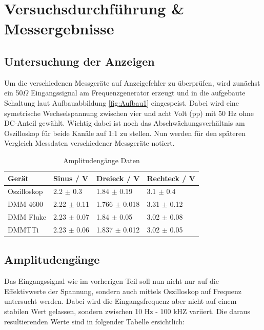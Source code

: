 \documentclass[12pt,a4paper,twoside]{article}
\begin{document}
\section{Versuchsdurchführung \& Messergebnisse} %


\subsection{Untersuchung der Anzeigen}

Um die verschiedenen Messgeräte auf Anzeigefehler zu überprüfen, wird zunächst ein 50$\Omega$ Eingangssignal am Frequenzgenerator erzeugt und in die aufgebaute Schaltung laut Aufbauabbildung \ref{fig:Aufbau1} eingespeist.
Dabei wird eine symetrische Wechselspannung zwischen vier und acht Volt (pp) mit 50 Hz ohne DC-Anteil gewählt. Wichtig dabei ist noch das Abschwächungsverhältnis am Oszilloskop für beide Kanäle auf 1:1 zu stellen. Nun werden für den späteren Vergleich Messdaten verschiedener Messgeräte notiert.

\begin{table}[H]
    \centering
    \caption{Amplitudengänge Daten}
    \label{tab:Daten1}
    \begin{tabular}{| l | l | l | l |}
        \hline
        Gerät   & Sinus / V  & Dreieck / V & Rechteck / V \\
        \hline
        Oszilloskop & 2.2 $\pm$ 0.3  & 1.84 $\pm$ 0.19  & 3.1 $\pm$ 0.4 \\
        DMM 4600    & 2.22 $\pm$ 0.11 & 1.766 $\pm$ 0.018 & 3.31 $\pm$ 0.12 \\
        DMM Fluke   & 2.23 $\pm$ 0.07 & 1.84 $\pm$ 0.05 & 3.02 $\pm$ 0.08 \\
        DMMTTi      & 2.23 $\pm$ 0.06 & 1.837 $\pm$ 0.012 & 3.02 $\pm$ 0.05 \\
        \hline
    \end{tabular}
\end{table}


\subsection{Amplitudengänge}

Das Eingangssignal wie im vorherigen Teil soll nun nicht nur auf die Effektivwerte der Spannung, sondern auch mittels Oszilloskop auf Frequenz untersucht werden.
Dabei wird die Eingangsfrequenz aber nicht auf einem stabilen Wert gelassen, sondern zwischen 10 Hz - 100 kHZ variiert. 
Die daraus resultierenden Werte sind in folgender Tabelle ersichtlich:
\end{document}
